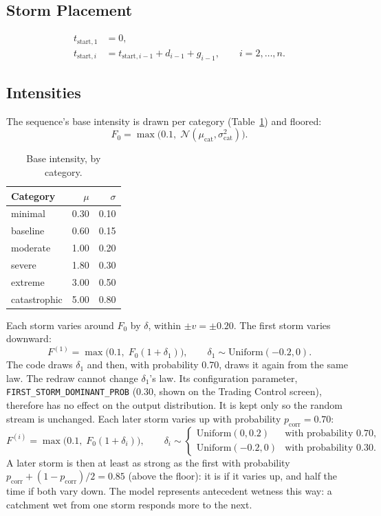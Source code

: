 \documentclass[11pt,a4paper]{article}
\begin{document}
\subsection{Storm Placement}
\begin{align}
    t_{\text{start},1} &= 0, \label{eq:t1}\\
    t_{\text{start},i} &= t_{\text{start},i-1} + d_{i-1} + g_{i-1}, \qquad i = 2, \dots, n. \label{eq:ti}
\end{align}

\subsection{Intensities}
The sequence's base intensity is drawn per category (Table~\ref{tab:base}) and floored:
\begin{equation}
    F_0 = \max\!\big(0.1,\; \mathcal{N}(\mu_{\text{cat}}, \sigma^2_{\text{cat}})\big). \label{eq:f0}
\end{equation}
\begin{table}[H]
\centering\small
\caption{Base intensity, by category.}\label{tab:base}
\begin{tabular}{lrr}
\toprule
Category & $\mu$ & $\sigma$ \\
\midrule
minimal & 0.30 & 0.10 \\ baseline & 0.60 & 0.15 \\ moderate & 1.00 & 0.20 \\
severe & 1.80 & 0.30 \\ extreme & 3.00 & 0.50 \\ catastrophic & 5.00 & 0.80 \\
\bottomrule
\end{tabular}
\end{table}
Each storm varies around $F_0$ by $\delta$, within $\pm v = \pm 0.20$. The first storm
varies downward:
\begin{equation}
    F^{(1)} = \max\!\big(0.1,\; F_0(1 + \delta_1)\big), \qquad \delta_1 \sim \text{Uniform}(-0.2, 0).
    \label{eq:first}
\end{equation}
The code draws $\delta_1$ and then, with probability 0.70, draws it again from the same law.
The redraw cannot change $\delta_1$'s law. Its configuration parameter,
\texttt{FIRST\_STORM\_DOMINANT\_PROB} (0.30, shown on the Trading Control screen), therefore
has no effect on the output distribution. It is kept only so the random stream is
unchanged. Each later storm varies up with probability $p_{\text{corr}} = 0.70$:
\begin{equation}
    F^{(i)} = \max\!\big(0.1,\; F_0(1 + \delta_i)\big), \qquad
    \delta_i \sim \begin{cases} \text{Uniform}(0, 0.2) & \text{with probability } 0.70, \\
    \text{Uniform}(-0.2, 0) & \text{with probability } 0.30. \end{cases} \label{eq:later}
\end{equation}
A later storm is then at least as strong as the first with probability
$p_{\text{corr}} + (1 - p_{\text{corr}})/2 = 0.85$ (above the floor): it is if it varies up,
and half the time if both vary down. The model represents antecedent wetness this way: a
catchment wet from one storm responds more to the next.
\end{document}
